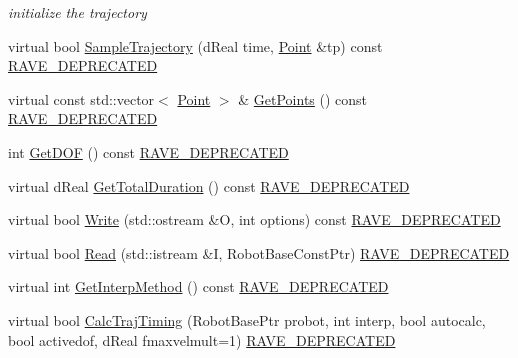 \begin{DoxyCompactItemize}
\begin{DoxyCompactList}\small\item\em initialize the trajectory \item\end{DoxyCompactList}\item 
virtual bool \hyperlink{classOpenRAVE_1_1TrajectoryBase_a59dda2f7a9f5935bf9542c394069f6ee}{SampleTrajectory} (dReal time, \hyperlink{classOpenRAVE_1_1TrajectoryBase_1_1Point}{Point} \&tp) const \hyperlink{classOpenRAVE_1_1TrajectoryBase_a16220697329e6c8f40dd5e0ec4f4b384}{RAVE\_\-DEPRECATED}
\item 
virtual const std::vector$<$ \hyperlink{classOpenRAVE_1_1TrajectoryBase_1_1Point}{Point} $>$ \& \hyperlink{classOpenRAVE_1_1TrajectoryBase_a28d819266bc461377ede27b048f0a2f5}{GetPoints} () const \hyperlink{classOpenRAVE_1_1TrajectoryBase_a16220697329e6c8f40dd5e0ec4f4b384}{RAVE\_\-DEPRECATED}
\item 
int \hyperlink{classOpenRAVE_1_1TrajectoryBase_a181d63496678472a4e902bcea6fea659}{GetDOF} () const \hyperlink{classOpenRAVE_1_1TrajectoryBase_a16220697329e6c8f40dd5e0ec4f4b384}{RAVE\_\-DEPRECATED}
\item 
virtual dReal \hyperlink{classOpenRAVE_1_1TrajectoryBase_a536656d38490de6aadc079c9f20b754d}{GetTotalDuration} () const \hyperlink{classOpenRAVE_1_1TrajectoryBase_a16220697329e6c8f40dd5e0ec4f4b384}{RAVE\_\-DEPRECATED}
\item 
virtual bool \hyperlink{classOpenRAVE_1_1TrajectoryBase_af8ac97f47745ae12998f6637e11ceaab}{Write} (std::ostream \&O, int options) const \hyperlink{classOpenRAVE_1_1TrajectoryBase_a16220697329e6c8f40dd5e0ec4f4b384}{RAVE\_\-DEPRECATED}
\item 
virtual bool \hyperlink{classOpenRAVE_1_1TrajectoryBase_ac92225ac78a03d41680a022e11a5f4b2}{Read} (std::istream \&I, RobotBaseConstPtr) \hyperlink{classOpenRAVE_1_1TrajectoryBase_a16220697329e6c8f40dd5e0ec4f4b384}{RAVE\_\-DEPRECATED}
\item 
virtual int \hyperlink{classOpenRAVE_1_1TrajectoryBase_aadc88793694f7fdb20427e235bcfed49}{GetInterpMethod} () const \hyperlink{classOpenRAVE_1_1TrajectoryBase_a16220697329e6c8f40dd5e0ec4f4b384}{RAVE\_\-DEPRECATED}
\item 
virtual bool \hyperlink{classOpenRAVE_1_1TrajectoryBase_ae8962475965fc74539a8a1ff1c227f61}{CalcTrajTiming} (RobotBasePtr probot, int interp, bool autocalc, bool activedof, dReal fmaxvelmult=1) \hyperlink{classOpenRAVE_1_1TrajectoryBase_a16220697329e6c8f40dd5e0ec4f4b384}{RAVE\_\-DEPRECATED}
\item 

\end{DoxyCompactItemize}
